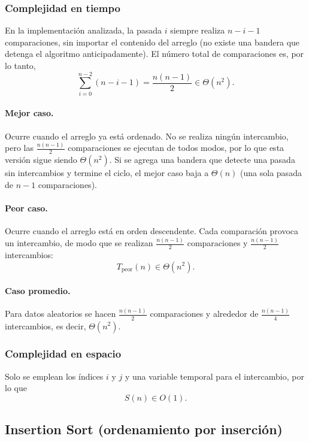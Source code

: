 \documentclass[11pt,letterpaper]{article}
\begin{document}
\subsubsection{Complejidad en tiempo}

En la implementación analizada, la pasada $i$ siempre realiza $n-i-1$ comparaciones, sin importar el contenido del arreglo (no existe una bandera que detenga el algoritmo anticipadamente). El número total de comparaciones es, por lo tanto,
\[
  \sum_{i=0}^{n-2} (n-i-1) = \frac{n(n-1)}{2} \in \Theta(n^2).
\]

\paragraph{Mejor caso.} Ocurre cuando el arreglo ya está ordenado. No se realiza ningún intercambio, pero las $\frac{n(n-1)}{2}$ comparaciones se ejecutan de todos modos, por lo que esta versión sigue siendo $\Theta(n^2)$. Si se agrega una bandera que detecte una pasada sin intercambios y termine el ciclo, el mejor caso baja a $\Theta(n)$ (una sola pasada de $n-1$ comparaciones).

\paragraph{Peor caso.} Ocurre cuando el arreglo está en orden descendente. Cada comparación provoca un intercambio, de modo que se realizan $\frac{n(n-1)}{2}$ comparaciones y $\frac{n(n-1)}{2}$ intercambios:
\[
  T_{\text{peor}}(n) \in \Theta(n^2).
\]

\paragraph{Caso promedio.} Para datos aleatorios se hacen $\frac{n(n-1)}{2}$ comparaciones y alrededor de $\frac{n(n-1)}{4}$ intercambios, es decir, $\Theta(n^2)$.

\subsubsection{Complejidad en espacio}

Solo se emplean los índices $i$ y $j$ y una variable temporal para el intercambio, por lo que
\[
  S(n) \in O(1).
\]

\subsection{Insertion Sort (ordenamiento por inserción)}
\end{document}
